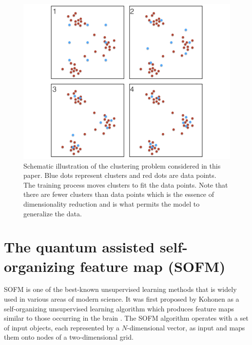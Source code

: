 \documentclass[pra,showkeys,twocolumn,showpacs]{revtex4-1}
\begin{document}
\begin{figure}
	\label{fig:sofm_fitting}
	\includegraphics[width=0.95\columnwidth]{sofm_fitting.png}
	\caption{
		Schematic illustration of the clustering problem considered in this paper.  
		Blue dots represent clusters and red dots are data points. 
		The training process moves clusters to fit the data points. 
		Note that there are fewer clusters than data points which is the essence of dimensionality reduction and is what permits the model to generalize the data.
	}
\end{figure}

















\section{The quantum assisted self-organizing feature map (SOFM)}
\label{sec:qasofm}

SOFM is one of the best-known unsupervised learning methods that is widely used in various areas of modern science. 
It was first proposed by Kohonen as a self-organizing unsupervised learning algorithm which produces feature maps similar to those occurring in the brain \cite{solan2001}. 
The SOFM algorithm operates with a set of input objects, each represented by a $N$-dimensional vector, as input and maps them onto nodes of a two-dimensional grid.
\end{document}
